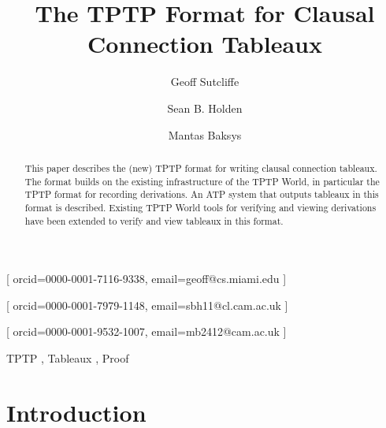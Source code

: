 \documentclass{ceurart}
\begin{document}
\title{The TPTP Format for Clausal Connection Tableaux}

\author[1]{Geoff Sutcliffe}[%
orcid=0000-0001-7116-9338,
email=geoff@cs.miami.edu
]
\address[1]{University of Miami, USA}
\author[2]{Sean B. Holden}[%
orcid=0000-0001-7979-1148,
email=sbh11@cl.cam.ac.uk
]
\address[2]{University of Cambridge, United Kingdom}
\author[2]{Mantas Baksys}[%
orcid=0000-0001-9532-1007,
email=mb2412@cam.ac.uk
]

\begin{abstract}
This paper describes the (new) TPTP format for writing clausal connection tableaux.
The format builds on the existing infrastructure of the TPTP World, in particular the TPTP format
for recording derivations.
An ATP system that outputs tableaux in this format is described.
Existing TPTP World tools for verifying and viewing derivations have been extended to
verify and view tableaux in this format.
\end{abstract}
\begin{keywords}
  TPTP \sep
  Tableaux \sep
  Proof
\end{keywords}

\maketitle
\section{Introduction}
\label{Introduction}
\end{document}
